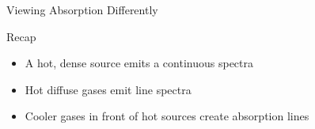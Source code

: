 \documentclass[pdf,xcolor={rgb},aspectratio=169]{beamer}
\begin{document}
\begin{frame}{Viewing Absorption Differently}
  \begin{center}
  \end{center}
\end{frame}

\begin{frame}{Recap}
  \begin{itemize}[<+->]
	\item A hot, dense source emits a continuous spectra
	\item Hot diffuse gases emit line spectra
	\item Cooler gases in front of hot sources create absorption lines
  \end{itemize}
\end{frame}
\end{document}
